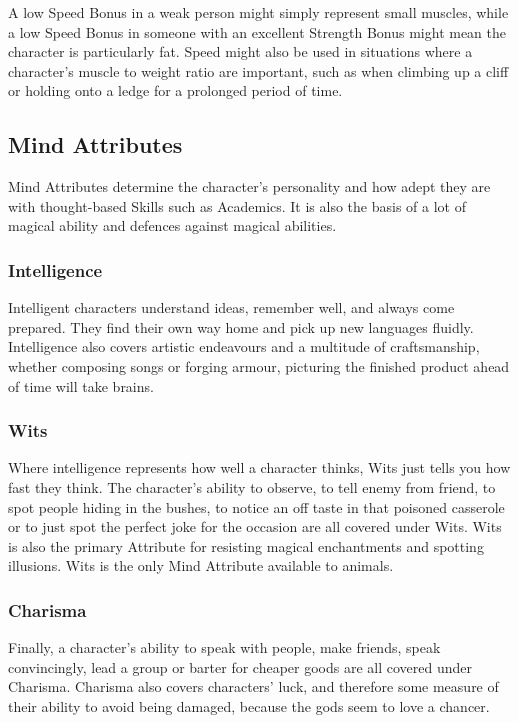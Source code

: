 \begin{multicols}{2}
A low Speed Bonus in a weak person might simply represent small muscles, while a low Speed Bonus in someone with an excellent Strength Bonus might mean the character is particularly fat.
Speed might also be used in situations where a character's muscle to weight ratio are important, such as when climbing up a cliff or holding onto a ledge for a prolonged period of time.

\subsection{Mind Attributes}

Mind Attributes determine the character's personality and how adept they are with thought-based Skills such as Academics. It is also the basis of a lot of magical ability and defences against magical abilities.

\subsubsection[Intelligence]{Intelligence }

Intelligent characters understand ideas, remember well, and always come prepared.
They find their own way home and pick up new languages fluidly.
Intelligence also covers artistic endeavours and a multitude of craftsmanship, whether composing songs or forging armour, picturing the finished product ahead of time will take brains.

\subsubsection[Wits]{Wits }

Where intelligence represents how well a character thinks, Wits just tells you how fast they think.
The character's ability to observe, to tell enemy from friend, to spot people hiding in the bushes, to notice an off taste in that poisoned casserole or to just spot the perfect joke for the occasion are all covered under Wits.
Wits is also the primary Attribute for resisting magical enchantments and spotting illusions.
Wits is the only Mind Attribute available to animals.

\subsubsection[Charisma]{Charisma }

Finally, a character's ability to speak with people, make friends, speak convincingly, lead a group or barter for cheaper goods are all covered under Charisma.
Charisma also covers characters' luck, and therefore some measure of their ability to avoid being damaged, because the gods seem to love a chancer.

\end{multicols}

